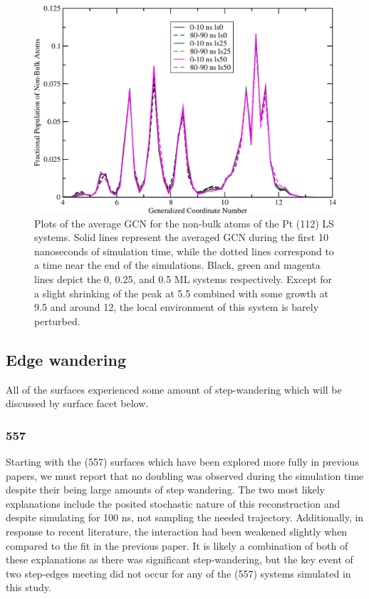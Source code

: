 \begin{figure}[p!]
  \includegraphics[width=\linewidth]{../figures/chap4/112ls_GCNF.pdf}
  \caption{Plots of the average GCN for the non-bulk atoms of the Pt (112) LS
systems. Solid lines represent the averaged GCN during the first 10 nanoseconds
of simulation time, while the dotted lines correspond to a time near the end of
the simulations. Black, green and magenta lines depict the 0, 0.25, and 0.5 ML
systems respectively. Except for a slight shrinking of the peak at 5.5 combined
with some growth at 9.5 and around 12, the local environment of this system is
barely perturbed.}
\label{fig:LS112GCNF}
\end{figure}

\subsection{Edge wandering}
All of the surfaces experienced some amount of step-wandering which will be
discussed by surface facet below.

\subsubsection{557}
Starting with the (557) surfaces which have been explored more fully in
previous papers,\citep{Tao:2010aa, Michalka:2013aa} we must  report
that no doubling was observed during the simulation time despite their being
large amounts of step wandering. The two most likely explanations include the
posited stochastic nature of this reconstruction and despite simulating for
100 ns, not sampling the needed trajectory. Additionally, in response to
recent literature\citep{Deshlahra:2012aa}, the  interaction had
been weakened slightly when compared to the fit in the previous
paper.\citep{Michalka:2013aa} It is likely a combination of both of these
explanations as there was significant step-wandering, but the key event of two
step-edges meeting did not occur for any of the (557) systems simulated in this
study.

